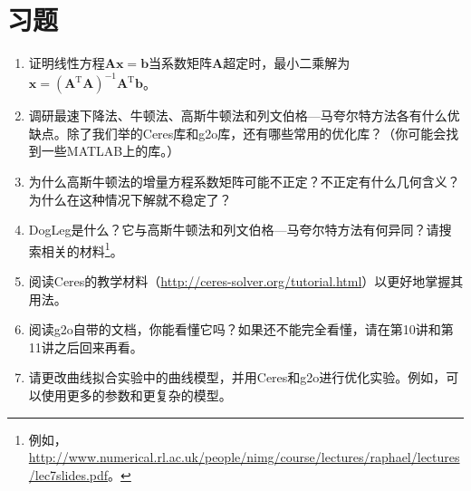 \section*{习题}
\begin{enumerate}
	\item 证明线性方程$\bm{A} \bm{x} = \bm{b}$当系数矩阵$\bm{A}$超定时，最小二乘解为$\bm{x} = (\bm{A}^\mathrm{T}\bm{A})^{-1}\bm{A}^\mathrm{T} \bm{b}$。
	\item 调研最速下降法、牛顿法、高斯牛顿法和列文伯格—马夸尔特方法各有什么优缺点。除了我们举的Ceres库和g2o库，还有哪些常用的优化库？（你可能会找到一些MATLAB上的库。）
	\item 为什么高斯牛顿法的增量方程系数矩阵可能不正定？不正定有什么几何含义？为什么在这种情况下解就不稳定了？
	\item DogLeg是什么？它与高斯牛顿法和列文伯格—马夸尔特方法有何异同？请搜索相关的材料\footnote{\mbox{例如，}\url{http://www.numerical.rl.ac.uk/people/nimg/course/lectures/raphael/lectures/lec7slides.pdf}。}。
	\item 阅读Ceres的教学材料（\url{http://ceres-solver.org/tutorial.html}）以更好地掌握其用法。
	\item 阅读g2o自带的文档，你能看懂它吗？如果还不能完全看懂，请在第10讲和第11讲之后回来再看。
	\item[\optional] 请更改曲线拟合实验中的曲线模型，并用Ceres和g2o进行优化实验。例如，可以使用更多的参数和更复杂的模型。
\end{enumerate}
